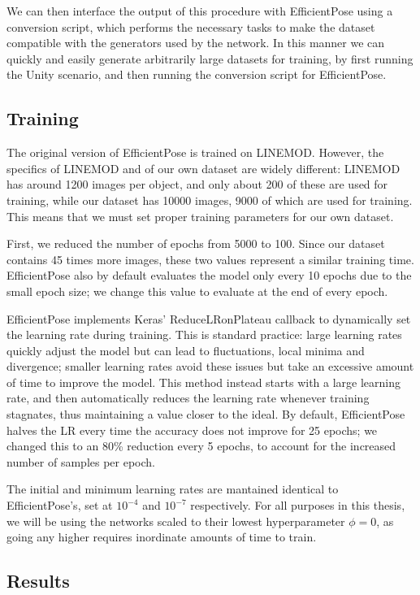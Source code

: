 We can then interface the output of this procedure with EfficientPose using a conversion script, which performs the necessary tasks to make the dataset compatible with the generators used by the network. In this manner we can quickly and easily generate arbitrarily large datasets for training, by first running the Unity scenario, and then running the conversion script for EfficientPose.

\subsection{Training}

The original version of EfficientPose is trained on LINEMOD. However, the specifics of LINEMOD and of our own dataset are widely different: LINEMOD has around 1200 images per object, and only about 200 of these are used for training, while our dataset has 10000 images, 9000 of which are used for training. This means that we must set proper training parameters for our own dataset.

First, we reduced the number of epochs from 5000 to 100. Since our dataset contains 45 times more images, these two values represent a similar training time. EfficientPose also by default evaluates the model only every 10 epochs due to the small epoch size; we change this value to evaluate at the end of every epoch.

EfficientPose implements Keras' ReduceLRonPlateau callback to dynamically set the learning rate during training. This is standard practice: large learning rates quickly adjust the model but can lead to fluctuations, local minima and divergence; smaller learning rates avoid these issues but take an excessive amount of time to improve the model\cite{ReduceLR}. This method instead starts with a large learning rate, and then automatically reduces the learning rate whenever training stagnates, thus maintaining a value closer to the ideal. By default, EfficientPose halves the LR every time the accuracy does not improve for 25 epochs; we changed this to an 80\% reduction every 5 epochs, to account for the increased number of samples per epoch.

The initial and minimum learning rates are mantained identical to EfficientPose's, set at $10^{-4}$ and $10^{-7}$ respectively. For all purposes in this thesis, we will be using the networks scaled to their lowest hyperparameter $\phi = 0$, as going any higher requires inordinate amounts of time to train.

\subsection{Results}

